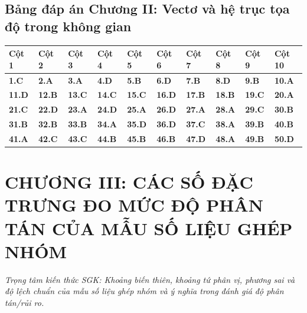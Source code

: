 \documentclass[11pt,a4paper]{article}
\begin{document}
\subsection*{\color{primary} Bảng đáp án Chương II: Vectơ và hệ trục tọa độ trong không gian}
\begin{center}
\renewcommand{\arraystretch}{1.25}
\begin{tabularx}{\textwidth}{*{10}{>{\centering\arraybackslash}X}}
\toprule
\textbf{\color{primary} Cột 1} & \textbf{\color{primary} Cột 2} & \textbf{\color{primary} Cột 3} & \textbf{\color{primary} Cột 4} & \textbf{\color{primary} Cột 5} & \textbf{\color{primary} Cột 6} & \textbf{\color{primary} Cột 7} & \textbf{\color{primary} Cột 8} & \textbf{\color{primary} Cột 9} & \textbf{\color{primary} Cột 10} \\
\midrule
\textbf{1.C} & \textbf{2.A} & \textbf{3.A} & \textbf{4.D} & \textbf{5.B} & \textbf{6.D} & \textbf{7.B} & \textbf{8.D} & \textbf{9.B} & \textbf{10.A} \\
\rowcolor{rowtint} \textbf{11.D} & \textbf{12.B} & \textbf{13.C} & \textbf{14.C} & \textbf{15.C} & \textbf{16.D} & \textbf{17.B} & \textbf{18.B} & \textbf{19.C} & \textbf{20.A} \\
\textbf{21.C} & \textbf{22.D} & \textbf{23.A} & \textbf{24.D} & \textbf{25.A} & \textbf{26.D} & \textbf{27.A} & \textbf{28.A} & \textbf{29.C} & \textbf{30.B} \\
\rowcolor{rowtint} \textbf{31.B} & \textbf{32.B} & \textbf{33.B} & \textbf{34.A} & \textbf{35.D} & \textbf{36.D} & \textbf{37.C} & \textbf{38.A} & \textbf{39.B} & \textbf{40.B} \\
\textbf{41.A} & \textbf{42.C} & \textbf{43.C} & \textbf{44.B} & \textbf{45.B} & \textbf{46.B} & \textbf{47.D} & \textbf{48.A} & \textbf{49.B} & \textbf{50.D} \\
\bottomrule
\end{tabularx}
\end{center}\vspace{10pt}
\section*{\color{primary} CHƯƠNG III: CÁC SỐ ĐẶC TRƯNG ĐO MỨC ĐỘ PHÂN TÁN CỦA MẪU SỐ LIỆU GHÉP NHÓM}
\textit{Trọng tâm kiến thức SGK: Khoảng biến thiên, khoảng tứ phân vị, phương sai và độ lệch chuẩn của mẫu số liệu ghép nhóm và ý nghĩa trong đánh giá độ phân tán/rủi ro.}\par\vspace{4pt}
\end{document}
